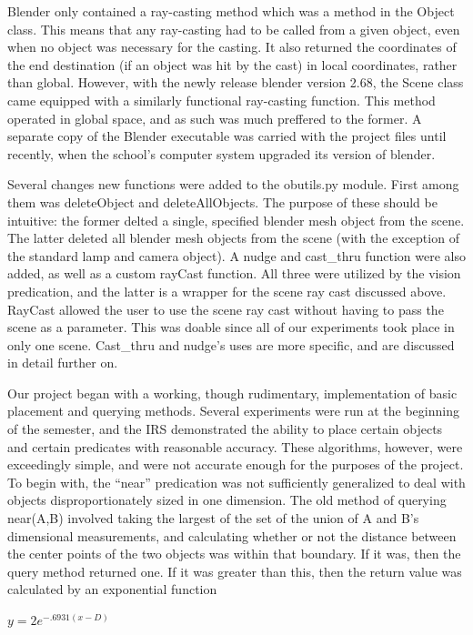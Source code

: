 Blender only contained a ray-casting method which was a method in the Object class. This means that any ray-casting had to be called from a given object, even when no object was necessary for the casting. It also returned the coordinates of the end destination (if an object was hit by the cast) in local coordinates, rather than global. However, with the newly release blender version 2.68, the Scene class came equipped with a similarly functional ray-casting function. This method operated in global space, and as such was much preffered to the former. A separate copy of the Blender executable was carried with the project files until recently, when the school's computer system upgraded its version of blender.

Several changes new functions were added to the obutils.py module. First among them was deleteObject and deleteAllObjects. The purpose of these should be intuitive: the former delted a single, specified blender mesh object from the scene. The latter deleted all blender mesh objects from the scene (with the exception of the standard lamp and camera object). A nudge and cast\_thru function were also added, as well as a custom rayCast function. All three were utilized by the vision predication, and the latter is a wrapper for the scene ray cast discussed above. RayCast allowed the user to use the scene ray cast without having to pass the scene as a parameter. This was doable since all of our experiments took place in only one scene. Cast\_thru and nudge's uses are more specific, and are discussed in detail further on.

Our project began with a working, though rudimentary, implementation of basic placement and querying methods. Several experiments were run at the beginning of the semester, and the IRS demonstrated the ability to place certain objects and certain predicates with reasonable accuracy. These algorithms, however, were exceedingly simple, and were not accurate enough for the purposes of the project.
To begin with, the “near” predication was not sufficiently generalized to deal with objects disproportionately sized in one dimension. The old method of querying near(A,B) involved taking the largest of the set of the union of A and B's dimensional measurements, and calculating whether or not the distance between the center points of the two objects was within that boundary. If it was, then the query method returned one. If it was greater than this, then the return value was calculated by an exponential function 

\begin{center}
$y = 2e^{-.6931(x-D)}$
\end{center}

